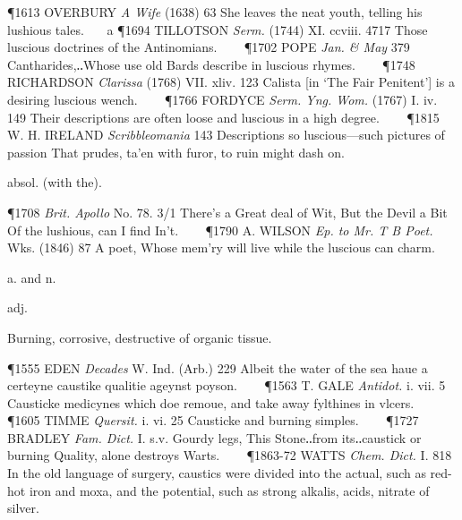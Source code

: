 \begin{description}[wide, labelwidth=!, labelindent=0pt]
\begin{myenumerate}
\P 1613 OVERBURY  \textit{A Wife} (1638) 63 She leaves the neat youth, telling his lushious tales.    a 
\P 1694 TILLOTSON  \textit{Serm.} (1744) XI. ccviii. 4717 Those luscious doctrines of the Antinomians.    
\P 1702 POPE  \textit{Jan. \& May} 379 Cantharides,‥Whose use old Bards describe in luscious rhymes.    
\P 1748 RICHARDSON  \textit{Clarissa} (1768) VII. xliv. 123 Calista [in ‘The Fair Penitent’] is a desiring luscious wench.    
\P 1766 FORDYCE  \textit{Serm. Yng. Wom.} (1767) I. iv. 149 Their descriptions are often loose and luscious in a high degree.    
\P 1815 W. H. IRELAND  \textit{Scribbleomania} 143 Descriptions so luscious—such pictures of passion That prudes, ta'en with furor, to ruin might dash on.

 absol. (with the).

\P 1708  \textit{Brit. Apollo} No. 78. 3/1 There's a Great deal of Wit, But the Devil a Bit Of the lushious, can I find In't.    
\P 1790 A. WILSON  \textit{Ep. to Mr. T  B  Poet.} Wks. (1846) 87 A poet, Whose mem'ry will live while the luscious can charm.
\end{myenumerate}


 a. and n.

\noindent {}

\vspace{-0.3cm}

\begin{myenumerate}

 adj.

 Burning, corrosive, destructive of organic tissue.

\P 1555 EDEN  \textit{Decades} W. Ind. (Arb.) 229 Albeit the water of the sea haue a certeyne caustike qualitie ageynst poyson.    
\P 1563 T. GALE  \textit{Antidot.} i. vii. 5 Causticke medicynes which doe remoue, and take away fylthines in vlcers.    
\P 1605 TIMME  \textit{Quersit.} i. vi. 25 Causticke and burning simples.    
\P 1727 BRADLEY  \textit{Fam. Dict.} I. s.v. Gourdy legs, This Stone‥from its‥caustick or burning Quality, alone destroys Warts.    
\P 1863-72 WATTS  \textit{Chem. Dict.} I. 818 In the old language of surgery, caustics were divided into the actual, such as red-hot iron and moxa, and the potential, such as strong alkalis, acids, nitrate of silver.


\end{myenumerate}
\end{description}
